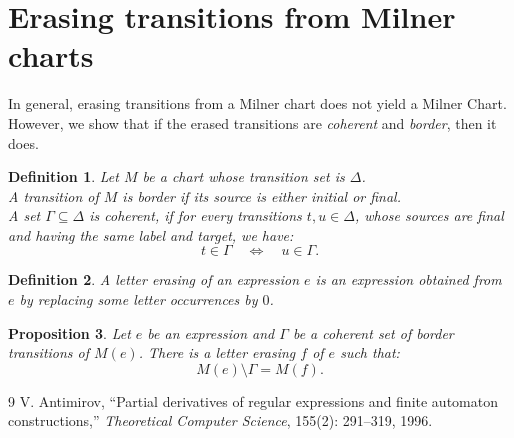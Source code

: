 \documentclass{article}
\newtheorem{definition}{Definition}[section]
\newtheorem{proposition}[definition]{Proposition}
\begin{document}
\section{Erasing transitions from Milner charts}

In general, erasing transitions from a Milner chart does not yield a Milner Chart. However, we show that if the erased transitions are \emph{coherent} and \emph{border}, then it does.

\begin{definition} Let $M$ be a chart whose transition set is $\Delta$.~\\[-5pt]

  A transition of $M$ is \emph{border} if its source is either initial or final.~\\[-5pt]
  
  A set $\Gamma\subseteq \Delta$ is \emph{coherent}, if for every  transitions  
  $t, u\in \Delta$, whose sources are final and having the same label and target, we have:\vspace{-4pt}
   $$ t\in \Gamma \quad \Leftrightarrow \quad u\in \Gamma.$$ 
\end{definition}


\begin{definition}  
A \emph{letter erasing} of an expression $e$ is an expression obtained from $e$ by replacing some letter occurrences by $0$.
\end{definition}

\begin{proposition} Let $e$ be an expression and $\Gamma$ be a coherent set of border transitions of $M(e)$. There is a letter erasing $f$ of $e$ such that:
  $$ M(e)\setminus \Gamma = M(f).$$
\end{proposition}



  \begin{thebibliography}{9}
V. Antimirov, ``Partial derivatives of regular expressions and finite automaton constructions,'' \emph{Theoretical Computer Science}, 155(2): 291--319, 1996.
\end{thebibliography}
\end{document}
